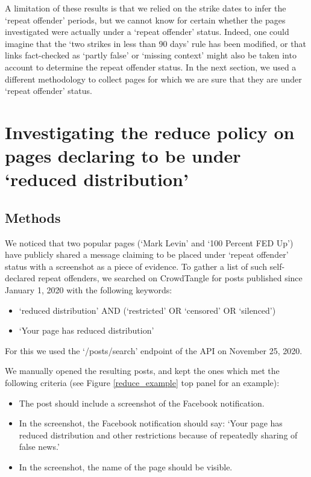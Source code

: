 \documentclass[review]{elsarticle}
\begin{document}
{{A limitation of these results is that we relied on the strike dates to infer the `repeat offender' periods, but we cannot know for certain whether the pages investigated were actually under a `repeat offender' status.
Indeed, one could imagine that the `two strikes in less than 90 days' rule has been modified, or that links fact-checked as `partly false' or `missing context' might also be taken into account to determine the repeat offender status.
In the next section, we used a different methodology to collect pages for which we are sure that they are under `repeat offender' status.

\section{Investigating the reduce policy on pages declaring to be under `reduced distribution'} 

\subsection{Methods}

We noticed that two popular pages (`Mark Levin' and `100 Percent FED Up') have publicly shared a message claiming to be placed under `repeat offender' status with a screenshot as a piece of evidence.
To gather a list of such self-declared repeat offenders, we searched on CrowdTangle for posts published since January 1, 2020 with the following keywords:
\begin{itemize}
\item `reduced distribution' AND (`restricted' OR `censored' OR `silenced')
\item `Your page has reduced distribution'
\end{itemize}
For this we used the `/posts/search' endpoint of the API on November 25, 2020. 

We manually opened the resulting posts, and kept the ones which met the following criteria (see Figure \ref{reduce_example} top panel for an example):
\begin{itemize}
\item The post should include a screenshot of the Facebook notification.
\item In the screenshot, the Facebook notification should say: `Your page has reduced distribution and other restrictions because of repeatedly sharing of false news.'
\item In the screenshot, the name of the page should be visible.
\end{itemize}

}}
\end{document}
